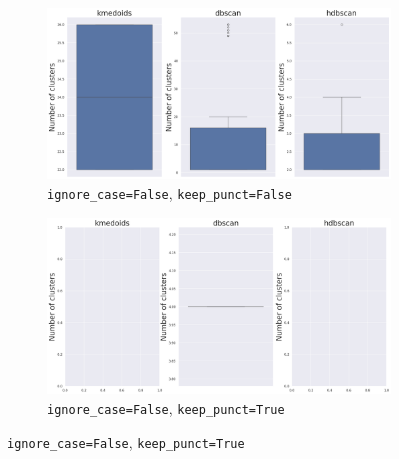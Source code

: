\documentclass[10pt,oneside]{report}
\begin{document}
\begin{figure}[H]
    \centering
    \begin{subfigure}[b]{\textwidth}
        \centering
        \includegraphics[width=\textwidth]{./images/nomic_false-false_whisker.png}
        \caption{\texttt{ignore\_case=False}, \texttt{keep\_punct=False}} \label{fig:nomic_ff_f4a_whisker}
    \end{subfigure}
    \hfill
    \begin{subfigure}[b]{\textwidth}
        \centering
        \includegraphics[width=\textwidth]{./images/nomic_true-false_whisker.png}
        \caption{\texttt{ignore\_case=False}, \texttt{keep\_punct=True}} \label{fig:nomic_ft_f4a_whisker}
    \end{subfigure}
\end{figure}
\end{document}
